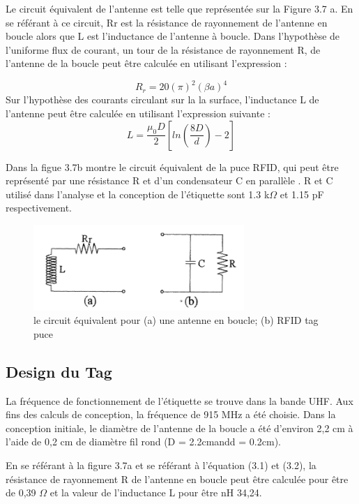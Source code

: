 \documentclass[11pt, a4paper, twoside]{book}
\begin{document}
Le circuit équivalent de l'antenne est telle que représentée sur la Figure 3.7 a. En se référant à ce circuit, Rr est la résistance de rayonnement de l'antenne en boucle alors que L est l'inductance de l'antenne à boucle. Dans l'hypothèse de l'uniforme flux de courant, un tour de la résistance de rayonnement R, de l'antenne de la boucle peut être calculée en utilisant l'expression \cite{antennatheory}:

\begin{equation}
R_{r}  = 20 (\pi)^{2}(\beta a)^{4}
\end{equation}
Sur l'hypothèse des courants circulant sur la la surface, l'inductance L de l'antenne peut être calculée en utilisant l'expression suivante \cite{antennatheory}:
\begin{equation}
L  = \frac{\mu_{0}D}{2}[ln(\frac{8D}{d})-2]
\end{equation}

Dans la figue 3.7b montre le circuit équivalent de la puce RFID, qui peut être représenté par une résistance R et d'un condensateur  C en parallèle . R et C utilisé dans l'analyse et la conception de l'étiquette sont 1.3 k\(\Omega\) et 1.15 pF respectivement.

\begin{figure}[H]
\centering
\includegraphics[width=8cm]{eq}
\caption{le circuit équivalent pour (a) une antenne en boucle; (b) RFID tag puce}
\end{figure}

\subsection{Design du Tag}
La fréquence de fonctionnement de l'étiquette se trouve dans la bande UHF.
Aux fins des calculs de conception, la fréquence de 915 MHz a été choisie. Dans la conception initiale, le diamètre de l'antenne de la boucle a été d'environ 2,2 cm à l'aide de 0,2 cm de diamètre fil rond (D = 2.2cmandd = 0.2cm).

En se référant à la figure 3.7a et se référant à l'équation (3.1) et (3.2), la résistance de rayonnement R de l'antenne en boucle peut être calculée pour être de 0,39  \(\Omega\) et la valeur de l'inductance L pour être nH 34,24.\\
\end{document}
